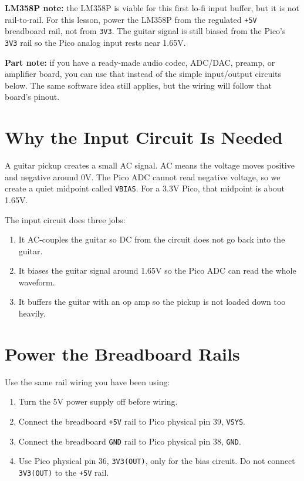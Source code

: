 \documentclass[11pt,letterpaper]{article}
\begin{document}
\textbf{LM358P note:} the LM358P is viable for this first lo-fi input buffer, but it is not rail-to-rail. For this lesson, power the LM358P from the regulated \texttt{+5V} breadboard rail, not from \texttt{3V3}. The guitar signal is still biased from the Pico's \texttt{3V3} rail so the Pico analog input rests near 1.65V.

\textbf{Part note:} if you have a ready-made audio codec, ADC/DAC, preamp, or amplifier board, you can use that instead of the simple input/output circuits below. The same software idea still applies, but the wiring will follow that board's pinout.

\section*{Why the Input Circuit Is Needed}
A guitar pickup creates a small AC signal. AC means the voltage moves positive and negative around 0V. The Pico ADC cannot read negative voltage, so we create a quiet midpoint called \texttt{VBIAS}. For a 3.3V Pico, that midpoint is about 1.65V.

The input circuit does three jobs:

\begin{enumerate}
    \item It AC-couples the guitar so DC from the circuit does not go back into the guitar.
    \item It biases the guitar signal around 1.65V so the Pico ADC can read the whole waveform.
    \item It buffers the guitar with an op amp so the pickup is not loaded down too heavily.
\end{enumerate}

\section*{Power the Breadboard Rails}
Use the same rail wiring you have been using:

\begin{enumerate}
    \item Turn the 5V power supply off before wiring.
    \item Connect the breadboard \texttt{+5V} rail to Pico physical pin 39, \texttt{VSYS}.
    \item Connect the breadboard \texttt{GND} rail to Pico physical pin 38, \texttt{GND}.
    \item Use Pico physical pin 36, \texttt{3V3(OUT)}, only for the bias circuit. Do not connect \texttt{3V3(OUT)} to the \texttt{+5V} rail.
\end{enumerate}
\end{document}
